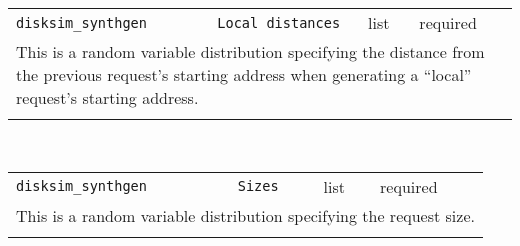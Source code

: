 \noindent 
\begin{tabular}{|p{1.5in}|p{3.5in}|p{0.5in}|p{0.5in}|}
\cline{1-4}
\texttt{disksim\_synthgen} & \texttt{Local distances} & list & required \\ 
\cline{1-4}
\multicolumn{4}{|p{6in}|}{
This is a random variable distribution specifying the distance from the
previous request's starting address when generating a ``local''
request's starting address.
}\\ 
\cline{1-4}
\multicolumn{4}{p{5in}}{}\\
\end{tabular}\\ 
\noindent 
\begin{tabular}{|p{1.5in}|p{3.5in}|p{0.5in}|p{0.5in}|}
\cline{1-4}
\texttt{disksim\_synthgen} & \texttt{Sizes} & list & required \\ 
\cline{1-4}
\multicolumn{4}{|p{6in}|}{
This is a random variable distribution specifying the request size.
}\\ 
\cline{1-4}
\multicolumn{4}{p{5in}}{}\\
\end{tabular}\\ 
